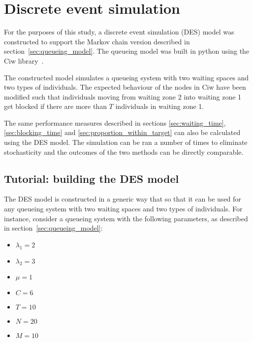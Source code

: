 \section{Discrete event simulation}\label{sec:appendix_des}

For the purposes of this study, a discrete event simulation (DES) model was
constructed to support the Markov chain version described in 
section~\ref{sec:queueing_model}.
The queueing model was built in python using the Ciw 
library~\cite{ciwpython}.

The constructed model simulates a queueing system with two waiting spaces and 
two types of individuals. 
The expected behaviour of the nodes in Ciw have been modified such that 
individuals moving from waiting zone 2 into waiting zone 1 get blocked 
if there are more than \(T\) individuals in waiting zone 1.

The same performance measures described in sections 
\ref{sec:waiting_time}, \ref{sec:blocking_time} and 
\ref{sec:proportion_within_target} can also be calculated using the DES model.
The simulation can be ran a number of times to eliminate stochasticity and the
outcomes of the two methods can be directly comparable. 

\subsection{Tutorial: building the DES model}

The DES model is constructed in a generic way that so that it can be used for
any queueing system with two waiting spaces and two types of individuals.
For instance, consider a queueing system with the following parameters, as 
described in section~\ref{sec:queueing_model}:

\begin{multicols}{4}
    \begin{itemize}
        \item \( \lambda_1 = 2 \)
        \item \( \lambda_2 = 3 \)
        \columnbreak
        \item \( \mu = 1 \)
        \item \( C = 6 \)
        \columnbreak
        \item \( T = 10 \)
        \item \( N = 20 \)
        \columnbreak
        \item \( M = 10 \)
    \end{itemize}
\end{multicols}


